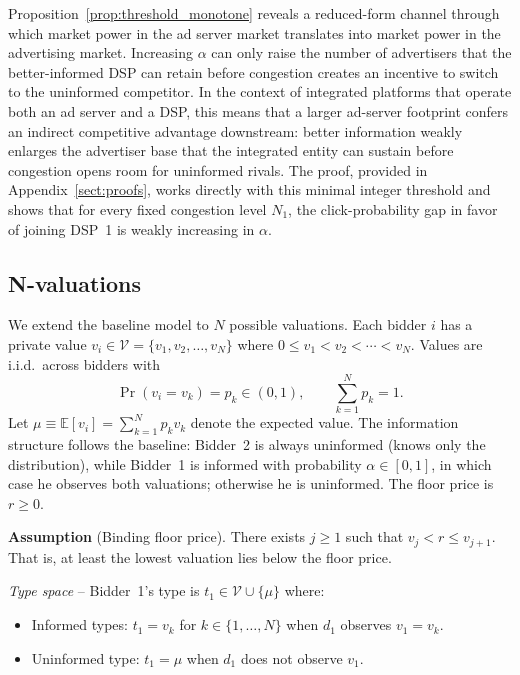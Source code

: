 \documentclass[11pt]{article}
\theoremstyle{plain}
\theoremstyle{definition}
\theoremstyle{plain}
\theoremstyle{plain}
\theoremstyle{plain}
\theoremstyle{plain}
\numberwithin{equation}{section}
\begin{document}
\noindent Proposition~\ref{prop:threshold_monotone} reveals a reduced-form channel through which market power in the ad server market translates into market power in the advertising market. Increasing $\alpha$ can only raise the number of advertisers that the better-informed DSP can retain before congestion creates an incentive to switch to the uninformed competitor. In the context of integrated platforms that operate both an ad server and a DSP, this means that a larger ad-server footprint confers an indirect competitive advantage downstream: better information weakly enlarges the advertiser base that the integrated entity can sustain before congestion opens room for uninformed rivals. The proof, provided in Appendix~\ref{sect:proofs}, works directly with this minimal integer threshold and shows that for every fixed congestion level $N_1$, the click-probability gap in favor of joining DSP~1 is weakly increasing in $\alpha$.
\vspace{4mm}
 
\subsection{N-valuations}\label{sect:N-values}

We extend the baseline model to $N$ possible valuations. Each bidder $i$ has a private value $v_i \in \mathcal{V} = \{v_1, v_2, \ldots, v_N\}$ where $0 \leq v_1 < v_2 < \cdots < v_N$. Values are i.i.d.\ across bidders with
\[
\Pr(v_i = v_k) = p_k \in (0,1), \qquad \sum_{k=1}^N p_k = 1.
\]
Let $\mu \equiv \mathbb{E}[v_i] = \sum_{k=1}^N p_k v_k$ denote the expected value. The information structure follows the baseline: Bidder~2 is always uninformed (knows only the distribution), while Bidder~1 is informed with probability $\alpha \in [0,1]$, in which case he observes both valuations; otherwise he is uninformed. The floor price is $r \geq 0$.
\vspace{0.2cm}

\noindent \textbf{Assumption} (Binding floor price). There exists $j \geq 1$ such that $v_j < r \leq v_{j+1}$. That is, at least the lowest valuation lies below the floor price.
\vspace{0.2cm}

\noindent \emph{Type space} -- Bidder~1's type is $t_1 \in \mathcal{V} \cup \{\mu\}$ where:
\begin{itemize}
    \item Informed types: $t_1 = v_k$ for $k \in \{1, \ldots, N\}$ when $d_1$ observes $v_1 = v_k$.
    \item Uninformed type: $t_1 = \mu$ when $d_1$ does not observe $v_1$.
\end{itemize}
\end{document}
